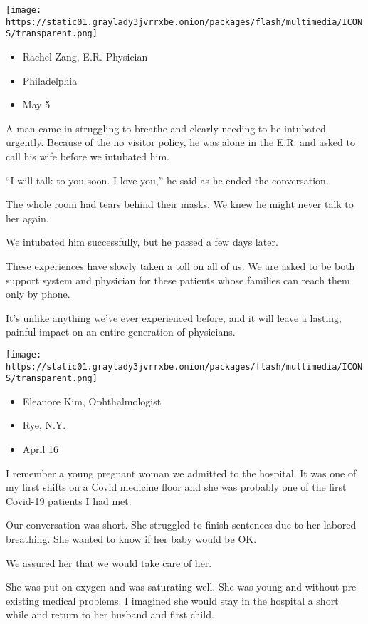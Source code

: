 \texttt{[image: https://static01.graylady3jvrrxbe.onion/packages/flash/multimedia/ICONS/transparent.png]}

\begin{itemize}
\tightlist
\item
  Rachel Zang, E.R. Physician
\item
  Philadelphia
\item
  May 5
\end{itemize}

A man came in struggling to breathe and clearly needing to be intubated
urgently. Because of the no visitor policy, he was alone in the E.R. and
asked to call his wife before we intubated him.

``I will talk to you soon. I love you,'' he said as he ended the
conversation.

The whole room had tears behind their masks. We knew he might never talk
to her again.

We intubated him successfully, but he passed a few days later.

These experiences have slowly taken a toll on all of us. We are asked to
be both support system and physician for these patients whose families
can reach them only by phone.

It's unlike anything we've ever experienced before, and it will leave a
lasting, painful impact on an entire generation of physicians.

\texttt{[image: https://static01.graylady3jvrrxbe.onion/packages/flash/multimedia/ICONS/transparent.png]}

\begin{itemize}
\tightlist
\item
  Eleanore Kim, Ophthalmologist
\item
  Rye, N.Y.
\item
  April 16
\end{itemize}

I remember a young pregnant woman we admitted to the hospital. It was
one of my first shifts on a Covid medicine floor and she was probably
one of the first Covid-19 patients I had met.

Our conversation was short. She struggled to finish sentences due to her
labored breathing. She wanted to know if her baby would be OK.

We assured her that we would take care of her.

She was put on oxygen and was saturating well. She was young and without
pre-existing medical problems. I imagined she would stay in the hospital
a short while and return to her husband and first child.

